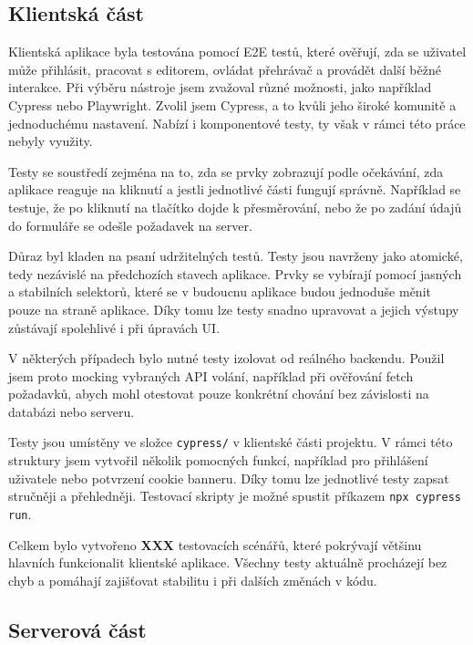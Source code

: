 \subsection{Klientská část}

Klientská aplikace byla testována pomocí E2E testů, které ověřují, zda se uživatel může přihlásit, pracovat s editorem, ovládat přehrávač a provádět další běžné interakce. 
Při výběru nástroje jsem zvažoval různé možnosti, jako například Cypress nebo Playwright. 
Zvolil jsem Cypress, a to kvůli jeho široké komunitě a jednoduchému nastavení.
Nabízí i komponentové testy, ty však v rámci této práce nebyly využity.

Testy se soustředí zejména na to, zda se prvky zobrazují podle očekávání, zda aplikace reaguje na kliknutí a jestli jednotlivé části fungují správně.
Například se testuje, že po kliknutí na tlačítko dojde k přesměrování, nebo že po zadání údajů do formuláře se odešle požadavek na server.

Důraz byl kladen na psaní udržitelných testů. 
Testy jsou navrženy jako atomické, tedy nezávislé na předchozích stavech aplikace. 
Prvky se vybírají pomocí jasných a stabilních selektorů, které se v budoucnu aplikace budou jednoduše měnit pouze na straně aplikace.
Díky tomu lze testy snadno upravovat a jejich výstupy zůstávají spolehlivé i při úpravách UI.

V některých případech bylo nutné testy izolovat od reálného backendu.
Použil jsem proto mocking vybraných API volání, například při ověřování fetch požadavků, abych mohl otestovat pouze konkrétní chování bez závislosti na databázi nebo serveru.

Testy jsou umístěny ve složce \texttt{cypress/} v klientské části projektu. 
V rámci této struktury jsem vytvořil několik pomocných funkcí, například pro přihlášení uživatele nebo potvrzení cookie banneru. 
Díky tomu lze jednotlivé testy zapsat stručněji a přehledněji.
Testovací skripty je možné spustit příkazem \verb|npx cypress run|.

Celkem bylo vytvořeno \textbf{XXX} testovacích scénářů, které pokrývají většinu hlavních funkcionalit klientské aplikace. 
Všechny testy aktuálně procházejí bez chyb a pomáhají zajišťovat stabilitu i při dalších změnách v kódu.

\subsection{Serverová část}

